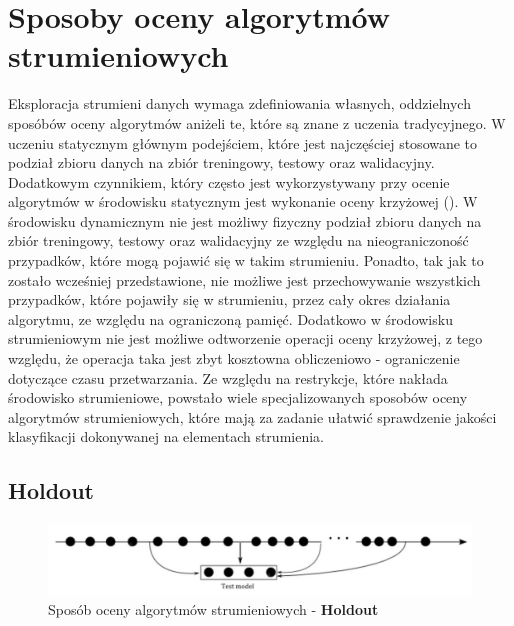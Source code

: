 \section{Sposoby oceny algorytmów strumieniowych}

\noindent Eksploracja strumieni danych wymaga zdefiniowania własnych, oddzielnych sposóbów oceny algorytmów aniżeli te, które są znane z uczenia tradycyjnego. W uczeniu statycznym głównym podejściem, które jest najczęściej stosowane to podział zbioru danych na zbiór treningowy, testowy oraz walidacyjny. Dodatkowym czynnikiem, który często jest wykorzystywany przy ocenie algorytmów w środowisku statycznym jest wykonanie oceny krzyżowej (). W środowisku dynamicznym nie jest możliwy fizyczny podział zbioru danych na zbiór treningowy, testowy oraz walidacyjny ze względu na nieograniczoność przypadków, które mogą pojawić się w takim strumieniu. Ponadto, tak jak to zostało wcześniej przedstawione, nie możliwe jest przechowywanie wszystkich przypadków, które pojawiły się w strumieniu, przez cały okres działania algorytmu, ze względu na ograniczoną pamięć. Dodatkowo w środowisku strumieniowym nie jest możliwe odtworzenie operacji oceny krzyżowej, z tego względu, że operacja taka jest zbyt kosztowna obliczeniowo - ograniczenie dotyczące czasu przetwarzania. Ze względu na restrykcje, które nakłada środowisko strumieniowe, powstało wiele specjalizowanych sposobów oceny algorytmów strumieniowych, które mają za zadanie ułatwić sprawdzenie jakości klasyfikacji dokonywanej na elementach strumienia.

\newpage

\subsection{Holdout}

\begin{figure}[h] 
    \centering
    \includegraphics[width=15cm]{figures/holdout.JPG}
    \caption{Sposób oceny algorytmów strumieniowych - \textbf{Holdout} \cite{Prezentacja:Strumienie}}\label{Figure:Holdout}
\end{figure}

